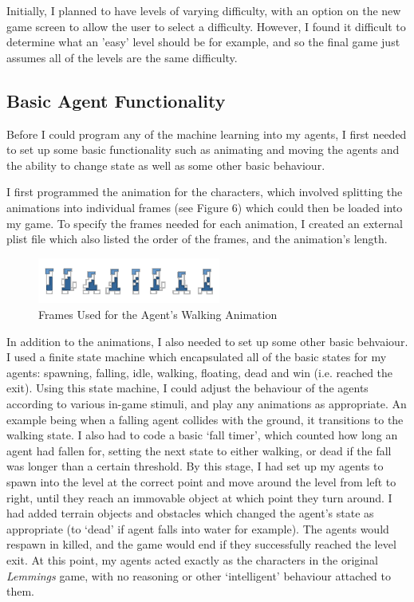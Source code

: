 \documentclass[a4paper,oneside]{report}
\begin{document}
Initially, I planned to have levels of varying difficulty, with an option on the new game screen to allow the user to select a difficulty. However, I found it difficult to determine what an 'easy' level should be for example, and so the final game just assumes all of the levels are the same difficulty. 

\subsection{Basic Agent Functionality}

Before I could program any of the machine learning into my agents, I first needed to set up some basic functionality such as animating and moving the agents and the ability to change state as well as some other basic behaviour.

I first programmed the animation for the characters, which involved splitting the animations into individual frames (see Figure 6) which could then be loaded into my game. To specify the frames needed for each animation, I created an external plist file which also listed the order of the frames, and the animation's length. 

\begin{figure}[h!]
  \centering
    \includegraphics[width=60mm]{sources/images/Lemming_walk_anim}
    \caption{Frames Used for the Agent's Walking Animation}
\end{figure}

In addition to the animations, I also needed to set up some other basic behvaiour. I used a finite state machine which encapsulated all of the basic states for my agents: spawning, falling, idle, walking, floating, dead and win (i.e. reached the exit). Using this state machine, I could adjust the behaviour of the agents according to various in-game stimuli, and play any animations as appropriate. An example being when a falling agent collides with the ground, it transitions to the walking state. I also had to code a basic `fall timer', which counted how long an agent had fallen for, setting the next state to either walking, or dead if the fall was longer than a certain threshold. By this stage, I had set up my agents to spawn into the level at the correct point and move around the level from left to right, until they reach an immovable object at which point they turn around. I had added terrain objects and obstacles which changed the agent's state as appropriate (to `dead' if agent falls into water for example). The agents would respawn in killed, and the game would end if they successfully reached the level exit. At this point, my agents acted exactly as the characters in the original \emph{Lemmings} game, with no reasoning or other `intelligent' behaviour attached to them.
\end{document}
